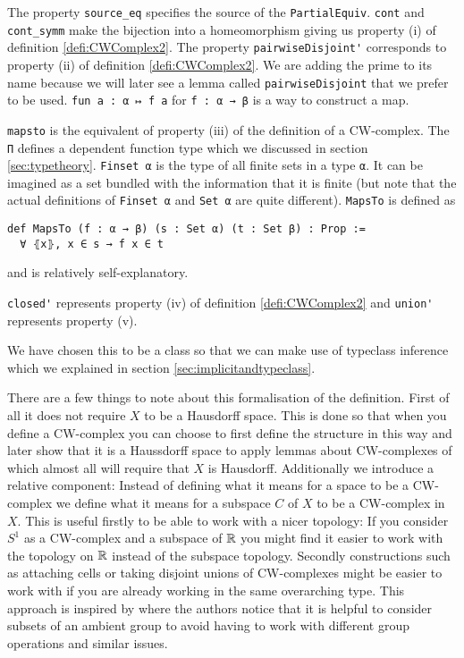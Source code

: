 The property \lstinline{source_eq} specifies the source of the \lstinline{PartialEquiv}. 
\lstinline{cont} and \lstinline{cont_symm} make the bijection into a homeomorphism giving us property (i) of definition \ref{defi:CWComplex2}.
The property \lstinline{pairwiseDisjoint'} corresponds to property (ii) of definition \ref{defi:CWComplex2}. 
We are adding the prime to its name because we will later see a lemma called \lstinline{pairwiseDisjoint} that we prefer to be used. 
\lstinline{fun a : α ↦ f a} for \lstinline{f : α → β} is a way to construct a map.

\lstinline{mapsto} is the equivalent of property (iii) of the definition of a CW-complex. 
The \lstinline{Π} defines a dependent function type which we discussed in section \ref{sec:typetheory}.
\lstinline{Finset α} is the type of all finite sets in a type \lstinline{α}. 
It can be imagined as a set bundled with the information that it is finite (but note that the actual definitions of \lstinline{Finset α} and \lstinline{Set α} are quite different).
\lstinline{MapsTo} is defined as
\begin{lstlisting}
def MapsTo (f : α → β) (s : Set α) (t : Set β) : Prop := 
  ∀ ⦃x⦄, x ∈ s → f x ∈ t
\end{lstlisting}

and is relatively self-explanatory. 

\lstinline{closed'} represents property (iv) of definition \ref{defi:CWComplex2} and \lstinline{union'} represents property (v). 

\medskip

We have chosen this to be a class so that we can make use of typeclass inference which we explained in section \ref{sec:implicitandtypeclass}.

There are a few things to note about this formalisation of the definition. 
First of all it does not require $X$ to be a Hausdorff space. 
This is done so that when you define a CW-complex you can choose to first define the structure in this way and later show that it is a Haussdorff space to apply lemmas about CW-complexes of which almost all will require that $X$ is Hausdorff. 
Additionally we introduce a relative component: 
Instead of defining what it means for a space to be a CW-complex we define what it means for a subspace $C$ of $X$ to be a CW-complex in $X$.
This is useful firstly to be able to work with a nicer topology: 
If you consider $S^1$ as a CW-complex and a subspace of $\mathbb{R}$ you might find it easier to work with the topology on $\mathbb{R}$ instead of the subspace topology. 
Secondly constructions such as attaching cells or taking disjoint unions of CW-complexes might be easier to work with if you are already working in the same overarching type.
This approach is inspired by \cite{Gonthier2013} where the authors notice that it is helpful to consider subsets of an ambient group to avoid having to work with different group operations and similar issues. 

